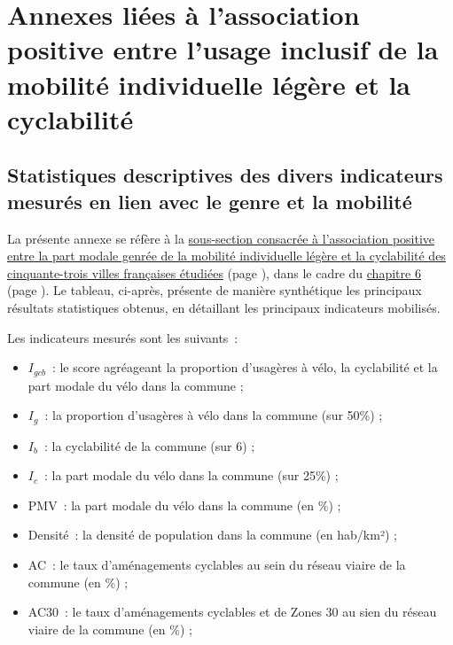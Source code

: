 \section{Annexes liées à l'association positive entre l'usage inclusif de la \gls{mobilité individuelle légère} et la \gls{cyclabilité}}
    \label{donnees-ouvertes:cyclabilite_genre}

    \newpage
\subsection{Statistiques descriptives des divers indicateurs mesurés en lien avec le genre et la mobilité}
    \label{donnees-ouvertes:calcul_cyclabilite_genre}

La présente annexe se réfère à la \hyperref[La micro-mobilité et la cyclabilité des territoires mises en relation avec une perspective sur le genre]{sous-section consacrée à l'association positive entre la part modale genrée de la mobilité individuelle légère et la cyclabilité des cinquante-trois villes françaises étudiées} (page \pageref{La micro-mobilité et la cyclabilité des territoires mises en relation avec une perspective sur le genre}), dans le cadre du \hyperref[chap6:titre]{chapitre 6} (page \pageref{chap6:titre}). Le tableau, ci-après, présente de manière synthétique les principaux résultats statistiques obtenus, en détaillant les principaux indicateurs mobilisés.\par

Les indicateurs mesurés sont les suivants~:
\begin{itemize}
    \item $I_{gcb}$~: le score agréageant la proportion d'usagères à vélo, la cyclabilité et la part modale du vélo dans la commune ;
    \item $I_{g}$~: la proportion d'usagères à vélo dans la commune (sur 50\%) ;
    \item $I_{b}$~: la cyclabilité de la commune (sur 6) ;
    \item $I_{c}$~: la part modale du vélo dans la commune (sur 25\%) ;
    \item PMV~: la part modale du vélo dans la commune (en \%) ;
    \item Densité~: la densité de population dans la commune (en hab/km²) ;
    \item AC~: le taux d'aménagements cyclables au sein du réseau viaire de la commune (en \%) ;
    \item AC30~: le taux d'aménagements cyclables et de Zones 30 au sien du réseau viaire de la commune (en \%) ;
\end{itemize}
    
